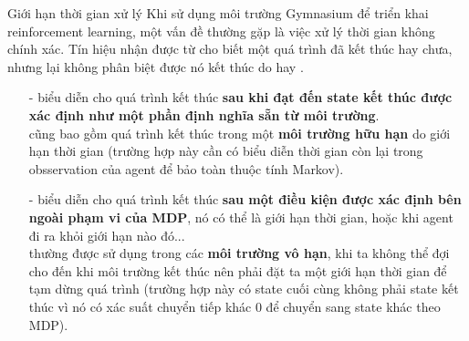 \documentclass[10pt,aspectratio=169]{beamer}
\begin{document}
\begin{frame}{Giới hạn thời gian xử lý}{\subsecname}
Khi sử dụng môi trường Gymnasium để triển khai reinforcement learning, một vấn đề thường gặp là việc xử lý thời gian không chính xác. Tín hiệu  nhận được từ  cho biết một quá trình đã kết thúc hay chưa, nhưng lại không phân biệt được nó kết thúc do  hay .\\
\vspace{4pt}
\footnotesize
\begin{itemize}
\setlength\itemsep{4pt}
\item[-]  biểu diễn cho quá trình kết thúc \textcolor{mainblue}{\textbf{sau khi đạt đến state kết thúc được xác định như một phần định nghĩa sẵn từ môi trường}}.\\
\vspace{2pt}
 cũng bao gồm quá trình kết thúc trong một \textcolor{mainblue}{\textbf{môi trường hữu hạn}} do giới hạn thời gian (trường hợp này cần có biểu diễn thời gian còn lại trong obsservation của agent để bảo toàn thuộc tính Markov).
\item[-]  biểu diễn cho quá trình kết thúc \textcolor{mainblue}{\textbf{sau một điều kiện được xác định bên ngoài phạm vi của MDP}}, nó có thể là giới hạn thời gian, hoặc khi agent đi ra khỏi giới hạn nào đó...\\
\vspace{2pt}
 thường được sử dụng trong các \textcolor{mainblue}{\textbf{môi trường vô hạn}}, khi ta không thể đợi cho đến khi môi trường kết thúc nên phải đặt ta một giới hạn thời gian để tạm dừng quá trình (trường hợp này có state cuối cùng không phải state kết thúc vì nó có xác suất chuyển tiếp khác 0 để chuyển sang state khác theo MDP).
\end{itemize}
\end{frame}
\end{document}
